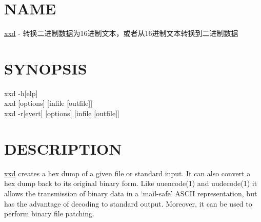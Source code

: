 \documentclass{ctexart}
\begin{document}
\section*{NAME}
\begin{adjustwidth}{1cm}{0cm}
\underline{xxd} - 转换二进制数据为16进制文本，或者从16进制文本转换到二进制数据
\end{adjustwidth}

\section*{SYNOPSIS}
\begin{adjustwidth}{1cm}{0cm}
xxd -h[elp] \\
xxd [options] [infile [outfile]] \\
xxd -r[evert] [options] [infile [outfile]]
\end{adjustwidth}

\section*{DESCRIPTION}
\begin{adjustwidth}{1cm}{0cm}
\underline{xxd} creates a hex dump of a given file or standard input.  It can
also convert a hex dump back to its original binary form.  Like uuencode(1) and
uudecode(1) it allows the transmission of binary data in a `mail-safe' ASCII
representation, but has the advantage of decoding to standard output.  Moreover,
it can be used to perform binary file patching. 
\end{adjustwidth}
\end{document}

